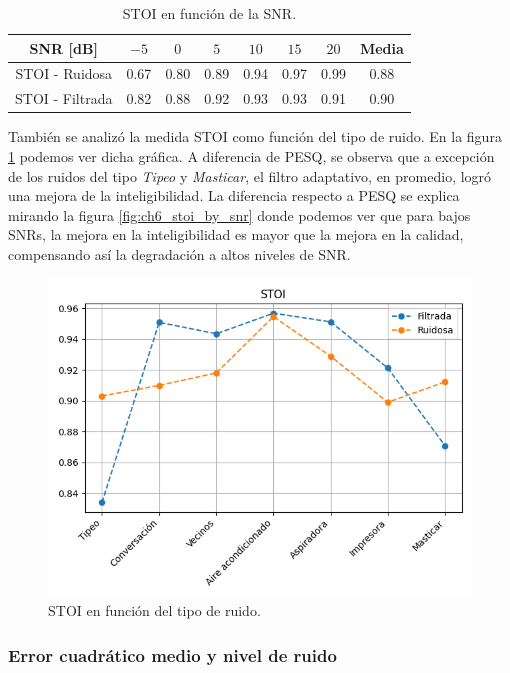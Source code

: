\begin{table}[ht]
	\centering
	\begin{tabular}{ |c|c|c|c|c|c|c|c| } 
		\hline
		SNR [dB] & $-5$ & $0$ & $5$ & $10$ & $15$ & $20$ & Media \\ 
		\hline
		STOI - Ruidosa & 0.67 & 0.80 & 0.89 & 0.94 & 0.97 & 0.99 & 0.88 \\
		STOI - Filtrada & 0.82 & 0.88 & 0.92 & 0.93 & 0.93 & 0.91 & 0.90 \\
		\hline
	\end{tabular}
	\caption{STOI en función de la SNR.}
	\label{table:stoi_by_snr}
\end{table}

También se analizó la medida STOI como función del tipo de ruido. En la figura \ref{fig:ch6_stoi_by_noise_type} podemos ver dicha gráfica. A diferencia de PESQ, se observa que a excepción de los ruidos del tipo \emph{Tipeo} y \emph{Masticar}, el filtro adaptativo, en promedio, logró una mejora de la inteligibilidad. La diferencia respecto a PESQ se explica mirando la figura \ref{fig:ch6_stoi_by_snr} donde podemos ver que para bajos SNRs, la mejora en la inteligibilidad es mayor que la mejora en la calidad, compensando así la degradación a altos niveles de SNR.

\begin{figure}
	\centering
	\centerline{\includegraphics[scale=0.75]{images/ch6/stoi_by_noise_type.png}}
	\caption{STOI en función del tipo de ruido.}
	\label{fig:ch6_stoi_by_noise_type}
\end{figure} 

\subsubsection{Error cuadrático medio y nivel de ruido}

